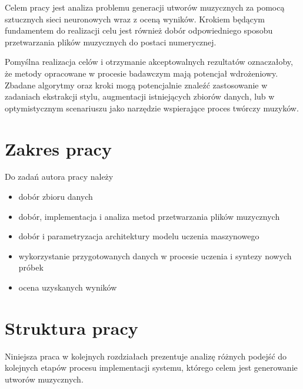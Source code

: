 {{        Celem pracy jest analiza problemu generacji utworów muzycznych za pomocą
        sztucznych sieci neuronowych wraz z oceną wyników. 
        Krokiem będącym fundamentem do realizacji celu jest również
        dobór odpowiedniego sposobu przetwarzania plików muzycznych do postaci numerycznej.
        
        
        Pomyślna realizacja celów i otrzymanie akceptowalnych rezultatów oznaczałoby, że
        metody opracowane w procesie badawczym mają potencjał wdrożeniowy. 
        Zbadane algorytmy oraz kroki mogą potencjalnie znaleźć zastosowanie
        w zadaniach ekstrakcji stylu, augmentacji istniejących zbiorów danych,
        lub w optymistycznym scenariuszu jako narzędzie wspierające proces twórczy muzyków.
    }

    \section{Zakres pracy}
    {
        Do zadań autora pracy należy
        \begin{itemize}
            \setlength\itemsep{-0.5em}
            \item dobór zbioru danych
            \item dobór, implementacja i analiza metod przetwarzania plików muzycznych
            \item dobór i parametryzacja architektury modelu uczenia maszynowego
            \item wykorzystanie przygotowanych danych 
            w procesie uczenia i syntezy nowych próbek
            \item ocena uzyskanych wyników
        \end{itemize}
    }

    \section{Struktura pracy}
    {
        Niniejsza praca w kolejnych rozdziałach prezentuje analizę różnych podejść do kolejnych etapów
        procesu implementacji systemu, którego celem jest generowanie utworów muzycznych. 

}}
